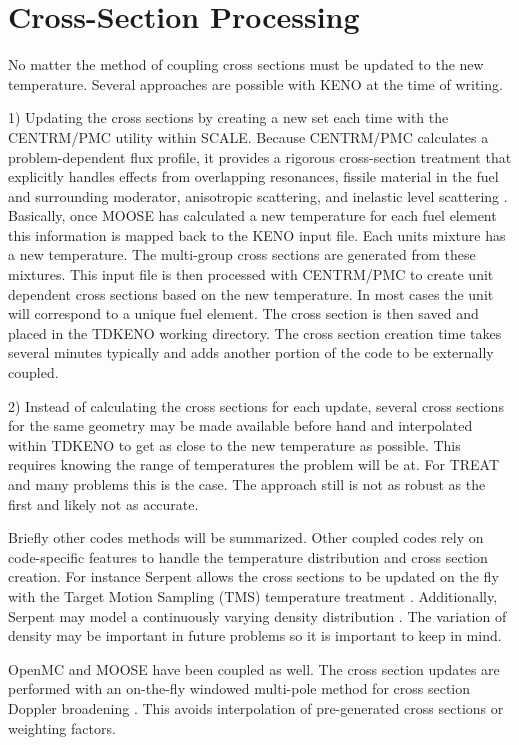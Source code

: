\documentclass[11pt]{article}
\begin{document}
\section{Cross-Section Processing}
No matter the method of coupling cross sections must be updated to the new temperature. Several approaches are possible with KENO at the time of writing.

1)	Updating the cross sections by creating a new set each time with the CENTRM/PMC utility within SCALE. Because CENTRM/PMC calculates a problem-dependent flux profile, it provides a rigorous cross-section treatment that explicitly handles effects from overlapping resonances, fissile material in the fuel and surrounding moderator, anisotropic scattering, and inelastic level scattering \cite{bowman2007overview}.  Basically, once MOOSE has calculated a new temperature for each fuel element this information is mapped back to the KENO input file.  Each units mixture has a new temperature.  The multi-group  cross sections are generated from these mixtures.  This input file is then processed with CENTRM/PMC to create unit dependent cross sections  based on the new temperature.  In most cases the unit will correspond to a unique fuel element. The cross section is then saved and placed in the TDKENO working directory.  The cross section creation time takes several minutes typically and adds another portion of the code to be externally coupled.  

2)  Instead of calculating the cross sections for each update, several cross sections for the same geometry may be made available before hand and interpolated within TDKENO to get as close to the new temperature as possible.  This requires knowing the range of temperatures the problem will be at.  For TREAT and many problems this is the case.  The approach still is not as robust as the first and likely not as accurate.

Briefly other codes methods will be summarized.  Other coupled codes rely on code-specific features to handle the temperature distribution and cross section creation.  For instance Serpent allows the cross sections to be updated on the fly with the Target Motion Sampling (TMS) temperature treatment \cite{viitanen2012explicit}. Additionally, Serpent may model a continuously varying density distribution \cite{leppanen2013modeling}.  The variation of density may be important in future problems so it is important to keep in mind.

OpenMC and MOOSE have been coupled as well.  The cross section updates are performed with an on-the-fly windowed multi-pole method for cross section Doppler broadening \cite{josey2016windowed}. This avoids interpolation of pre-generated cross sections or  weighting factors.  
\end{document}
